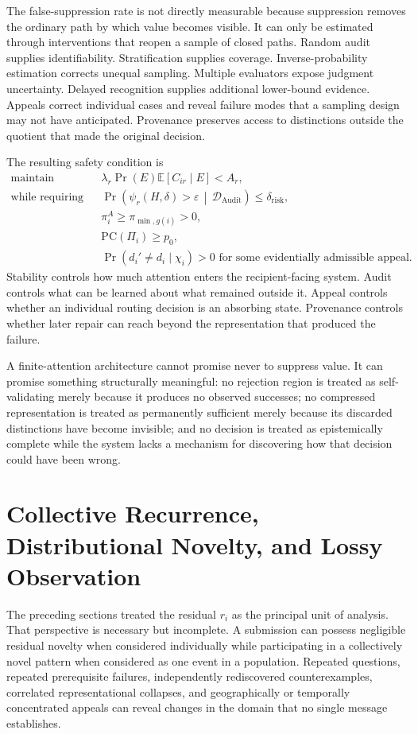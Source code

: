 \documentclass[11pt]{article}
\theoremstyle{definition}
\DeclareMathOperator{\Audit}{Audit}
\DeclareMathOperator{\Prob}{Pr}
\newcommand{\E}{\mathbb{E}}
\newcommand{\given}{\,\middle|\,}
\newcommand{\eps}{\varepsilon}
\begin{document}
The false-suppression rate is not directly measurable because suppression removes the ordinary path by which value becomes visible. It can only be estimated through interventions that reopen a sample of closed paths. Random audit supplies identifiability. Stratification supplies coverage. Inverse-probability estimation corrects unequal sampling. Multiple evaluators expose judgment uncertainty. Delayed recognition supplies additional lower-bound evidence. Appeals correct individual cases and reveal failure modes that a sampling design may not have anticipated. Provenance preserves access to distinctions outside the quotient that made the original decision.

The resulting safety condition is
\[
\begin{aligned}
\text{maintain}\quad&
\lambda_r\Prob(E)\E[C_{ir}\mid E]<A_r,
\\
\text{while requiring}\quad&
\Prob\!\left(
\psi_r(H,\delta)>\eps
\given
\mathcal{D}_{\Audit}
\right)
\leq
\delta_{\mathrm{risk}},
\\
&
\pi_i^{A}\geq\pi_{\min,g(i)}>0,
\\
&
\mathrm{PC}(\Pi_i)\geq p_0,
\\
&
\Prob(d_i'\neq d_i\mid\chi_i)>0
\text{ for some evidentially admissible appeal}.
\end{aligned}
\]
Stability controls how much attention enters the recipient-facing system. Audit controls what can be learned about what remained outside it. Appeal controls whether an individual routing decision is an absorbing state. Provenance controls whether later repair can reach beyond the representation that produced the failure.

A finite-attention architecture cannot promise never to suppress value. It can promise something structurally meaningful: no rejection region is treated as self-validating merely because it produces no observed successes; no compressed representation is treated as permanently sufficient merely because its discarded distinctions have become invisible; and no decision is treated as epistemically complete while the system lacks a mechanism for discovering how that decision could have been wrong.
\section{Collective Recurrence, Distributional Novelty, and Lossy Observation}

The preceding sections treated the residual \(r_i\) as the principal unit of analysis. That perspective is necessary but incomplete. A submission can possess negligible residual novelty when considered individually while participating in a collectively novel pattern when considered as one event in a population. Repeated questions, repeated prerequisite failures, independently rediscovered counterexamples, correlated representational collapses, and geographically or temporally concentrated appeals can reveal changes in the domain that no single message establishes.
\end{document}
